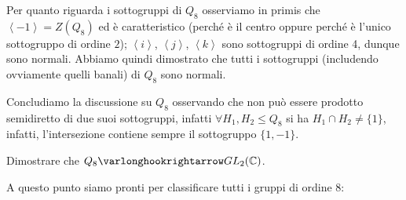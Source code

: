 \documentclass[11pt]{scrartcl}
\begin{document}
\begin{remark}
    [Sottogruppi di $Q_8$]
    Per quanto riguarda i sottogruppi di $Q_8$ osserviamo in primis che $\left<-1\right> = Z(Q_8)$ ed è caratteristico (perché è il centro oppure perché è l'unico sottogruppo di ordine $2$);
    $\left<i\right>$, $\left<j\right>$, $\left<k\right>$ sono sottogruppi di ordine 4, dunque sono normali. Abbiamo quindi dimostrato che tutti i sottogruppi (includendo ovviamente quelli banali) di $Q_8$ sono normali.
\end{remark}

Concludiamo la discussione su $Q_8$ osservando che non può essere prodotto semidiretto di due suoi sottogruppi, infatti $\forall H_1,H_2 \leqslant Q_8$ si ha $H_1 \cap H_2 \ne \{1\}$, infatti, l'intersezione 
contiene sempre il sottogruppo $\{1,-1\}$.

\begin{exercise}
    Dimostrare che $Q_8 \varlonghookrightarrow GL_2(\CC)$.
\end{exercise}

\begin{soln}
\end{soln}

\newpage
A questo punto siamo pronti per classificare tutti i gruppi di ordine 8:
\end{document}
